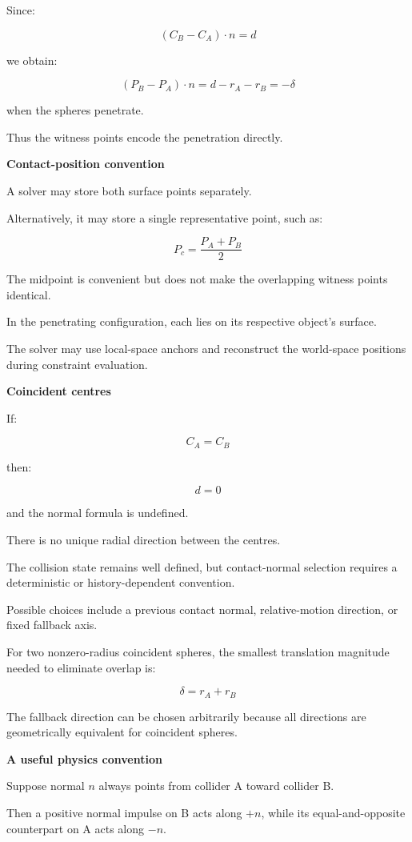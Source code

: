 Since:

\[
(C_B-C_A)\cdot n=d
\]

we obtain:

\[
\boxed{ (P_B-P_A)\cdot n=d-r_A-r_B=-\delta }
\]

when the spheres penetrate.

Thus the witness points encode the penetration directly.

\textbf{Contact-position convention}

A solver may store both surface points separately.

Alternatively, it may store a single representative point, such as:

\[
P_c=\frac{P_A+P_B}{2}
\]

The midpoint is convenient but does not make the overlapping witness points identical.

In the penetrating configuration, each lies on its respective object's surface.

The solver may use local-space anchors and reconstruct the world-space positions during constraint evaluation.

\textbf{Coincident centres}

If:

\[
C_A=C_B
\]

then:

\[
d=0
\]

and the normal formula is undefined.

There is no unique radial direction between the centres.

The collision state remains well defined, but contact-normal selection requires a deterministic or history-dependent convention.

Possible choices include a previous contact normal, relative-motion direction, or fixed fallback axis.

For two nonzero-radius coincident spheres, the smallest translation magnitude needed to eliminate overlap is:

\[
\delta=r_A+r_B
\]

The fallback direction can be chosen arbitrarily because all directions are geometrically equivalent for coincident spheres.

\textbf{A useful physics convention}

Suppose normal \(n\) always points from collider A toward collider B.

Then a positive normal impulse on B acts along \(+n\), while its equal-and-opposite counterpart on A acts along \(-n\).


